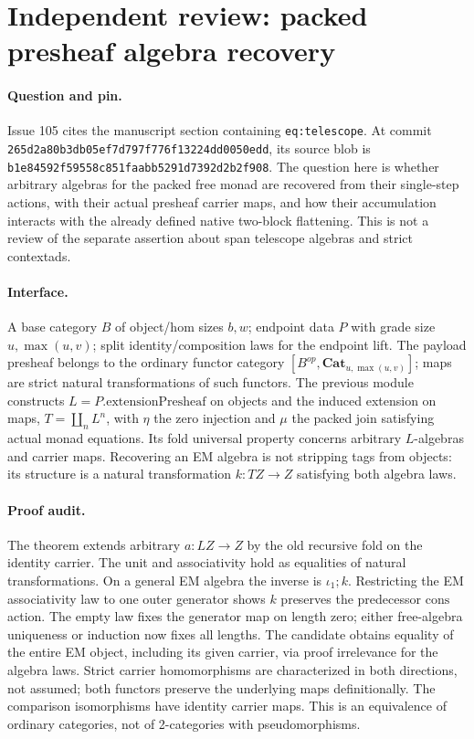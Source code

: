 \documentclass{article}
\begin{document}
\section*{Independent review: packed presheaf algebra recovery}
\paragraph{Question and pin.}
Issue 105 cites the manuscript section containing \texttt{eq:telescope}.
At commit \texttt{265d2a80b3db05ef7d797f776f13224dd0050edd},
its source blob is \texttt{b1e84592f59558c851faabb5291d7392d2b2f908}.
The question here is whether arbitrary algebras for the packed free monad are recovered from their single-step actions, with their actual presheaf carrier maps, and how their accumulation interacts with the already defined native two-block flattening. This is not a review of the separate assertion about span telescope algebras and strict contextads.
\paragraph{Interface.} A base category $B$ of object/hom sizes $b,w$; endpoint data $P$ with grade size $u,\max(u,v)$; split identity/composition laws for the endpoint lift. The payload presheaf belongs to the ordinary functor category $[B^{op},\mathbf{Cat}_{u,\max(u,v)}]$; maps are strict natural transformations of such functors. The previous module constructs $L=P.\mathrm{extensionPresheaf}$ on objects and the induced extension on maps, $T=\coprod_nL^n$, with $\eta$ the zero injection and $\mu$ the packed join satisfying actual monad equations. Its fold universal property concerns arbitrary $L$-algebras and carrier maps. Recovering an EM algebra is not stripping tags from objects: its structure is a natural transformation $k:TZ\to Z$ satisfying both algebra laws.
\paragraph{Proof audit.} The theorem extends arbitrary $a:LZ\to Z$ by the old recursive fold on the identity carrier. The unit and associativity hold as equalities of natural transformations. On a general EM algebra the inverse is $\iota_1;k$. Restricting the EM associativity law to one outer generator shows $k$ preserves the predecessor $\mathrm{cons}$ action. The empty law fixes the generator map on length zero; either free-algebra uniqueness or induction now fixes all lengths. The candidate obtains equality of the entire EM object, including its given carrier, via proof irrelevance for the algebra laws. Strict carrier homomorphisms are characterized in both directions, not assumed; both functors preserve the underlying maps definitionally. The comparison isomorphisms have identity carrier maps. This is an equivalence of ordinary categories, not of 2-categories with pseudomorphisms.
\end{document}
